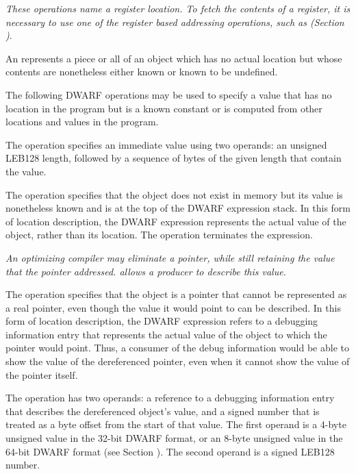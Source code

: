 \textit{These operations name a register location. To
fetch the contents of a register, it is necessary to use
one of the register based addressing operations, such as
\DWOPbregx{} 
(Section )}.

An 
represents a piece or all
of an object which has no actual location but whose contents
are nonetheless either known or known to be undefined.

The following DWARF operations may be used to specify a value
that has no location in the program but is a known constant
or is computed from other locations and values in the program.
\begin{enumerate}[1. ]
\itembfnl{\DWOPimplicitvalueTARG}
The \DWOPimplicitvalueNAME{} operation specifies an immediate value
using two operands: an unsigned LEB128
length, followed by a 
sequence of bytes of the given length that contain the value.

\itembfnl{\DWOPstackvalueTARG}
The \DWOPstackvalueNAME{} 
operation specifies that the object
does not exist in memory but its value is nonetheless known
and is at the top of the DWARF expression stack. In this form
of location description, the DWARF expression represents the
actual value of the object, rather than its location. The
\DWOPstackvalueNAME{} operation terminates the expression.

\itembfnl{\DWOPimplicitpointerTARG}
\textit{An optimizing compiler may eliminate a pointer, while
still retaining the value that the pointer addressed.  
\DWOPimplicitpointerNAME{} allows a producer to describe this value.}

The \DWOPimplicitpointerNAME{} operation specifies that the object
is a pointer that cannot be represented as a real pointer,
even though the value it would point to can be described. In
this form of location description, the DWARF expression refers
to a debugging information entry that represents the actual
value of the object to which the pointer would point. Thus, a
consumer of the debug information would be able to show the
value of the dereferenced pointer, even when it cannot show
the value of the pointer itself.

The \DWOPimplicitpointerNAME{} operation has two operands: a 
reference to a debugging information entry that describes 
the dereferenced object's value, and a signed number that 
is treated as a byte offset from the start of that value. 
The first operand is a 4-byte unsigned value in the 32-bit 
DWARF format, or an 8-byte unsigned value in the 64-bit 
DWARF format (see Section 
).
The second operand is a 
signed LEB128 number.


\end{enumerate}
